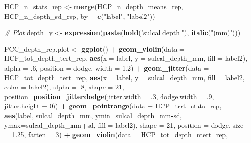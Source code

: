 \documentclass[
]{article}
\newenvironment{Shaded}{\begin{snugshade}}{\end{snugshade}}
\newcommand{\CommentTok}[1]{\textcolor[rgb]{0.56,0.35,0.01}{\textit{#1}}}
\newcommand{\DataTypeTok}[1]{\textcolor[rgb]{0.13,0.29,0.53}{#1}}
\newcommand{\DecValTok}[1]{\textcolor[rgb]{0.00,0.00,0.81}{#1}}
\newcommand{\FloatTok}[1]{\textcolor[rgb]{0.00,0.00,0.81}{#1}}
\newcommand{\KeywordTok}[1]{\textcolor[rgb]{0.13,0.29,0.53}{\textbf{#1}}}
\newcommand{\NormalTok}[1]{#1}
\newcommand{\OperatorTok}[1]{\textcolor[rgb]{0.81,0.36,0.00}{\textbf{#1}}}
\newcommand{\StringTok}[1]{\textcolor[rgb]{0.31,0.60,0.02}{#1}}
\begin{document}
\begin{Shaded}
\begin{Highlighting}[]
\NormalTok{HCP_n_stats_rep <-}\StringTok{ }\KeywordTok{merge}\NormalTok{(HCP_n_depth_means_rep, HCP_n_depth_sd_rep, }\DataTypeTok{by =} \KeywordTok{c}\NormalTok{(}\StringTok{"label"}\NormalTok{, }\StringTok{"label2"}\NormalTok{))}

\CommentTok{# Plot}
\NormalTok{depth_y <-}\StringTok{ }\KeywordTok{expression}\NormalTok{(}\KeywordTok{paste}\NormalTok{(}\KeywordTok{bold}\NormalTok{(}\StringTok{"sulcal depth "}\NormalTok{), }\KeywordTok{italic}\NormalTok{(}\StringTok{"(mm)"}\NormalTok{)))}

\NormalTok{PCC_depth_rep.plot <-}\StringTok{ }\KeywordTok{ggplot}\NormalTok{() }\OperatorTok{+}
\StringTok{  }\KeywordTok{geom_violin}\NormalTok{(}\DataTypeTok{data =}\NormalTok{ HCP_tot_depth_tert_rep, }
              \KeywordTok{aes}\NormalTok{(}\DataTypeTok{x =}\NormalTok{ label, }\DataTypeTok{y =}\NormalTok{ sulcal_depth_mm, }\DataTypeTok{fill =}\NormalTok{ label2), }
              \DataTypeTok{alpha =} \FloatTok{.6}\NormalTok{, }\DataTypeTok{position =}\NormalTok{ dodge, }\DataTypeTok{width =} \FloatTok{1.2}\NormalTok{) }\OperatorTok{+}\StringTok{ }
\StringTok{  }\KeywordTok{geom_jitter}\NormalTok{(}\DataTypeTok{data =}\NormalTok{ HCP_tot_depth_tert_rep, }
              \KeywordTok{aes}\NormalTok{(}\DataTypeTok{x =}\NormalTok{ label, }\DataTypeTok{y =}\NormalTok{ sulcal_depth_mm, }\DataTypeTok{fill =}\NormalTok{ label2, }\DataTypeTok{color =}\NormalTok{ label2), }
              \DataTypeTok{alpha =} \FloatTok{.8}\NormalTok{, }\DataTypeTok{shape =} \DecValTok{21}\NormalTok{,}
              \DataTypeTok{position=}\KeywordTok{position_jitterdodge}\NormalTok{(}\DataTypeTok{jitter.width =} \FloatTok{.3}\NormalTok{, }\DataTypeTok{dodge.width =} \FloatTok{.9}\NormalTok{, }\DataTypeTok{jitter.height =} \DecValTok{0}\NormalTok{)) }\OperatorTok{+}
\StringTok{  }\KeywordTok{geom_pointrange}\NormalTok{(}\DataTypeTok{data =}\NormalTok{ HCP_tert_stats_rep, }
                  \KeywordTok{aes}\NormalTok{(label, sulcal_depth_mm, }\DataTypeTok{ymin=}\NormalTok{sulcal_depth_mm}\OperatorTok{-}\NormalTok{sd, }\DataTypeTok{ymax=}\NormalTok{sulcal_depth_mm}\OperatorTok{+}\NormalTok{sd, }\DataTypeTok{fill =}\NormalTok{ label2), }
                  \DataTypeTok{shape =} \DecValTok{21}\NormalTok{, }\DataTypeTok{position =}\NormalTok{ dodge, }\DataTypeTok{size =} \FloatTok{1.25}\NormalTok{, }\DataTypeTok{fatten =} \DecValTok{3}\NormalTok{) }\OperatorTok{+}
\StringTok{  }
\StringTok{  }\KeywordTok{geom_violin}\NormalTok{(}\DataTypeTok{data =}\NormalTok{ HCP_tot_depth_ntert_rep, }

\end{Highlighting}
\end{Shaded}
\end{document}
